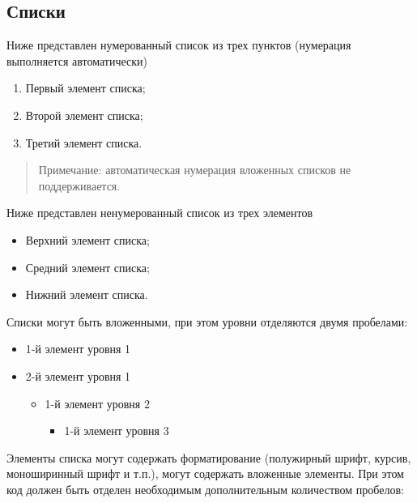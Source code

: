 \documentclass[
  a4paper,
]{book}
\providecommand{\tightlist}{%
  \setlength{\itemsep}{0pt}\setlength{\parskip}{0pt}}
\theoremstyle{definition}
\theoremstyle{definition}
\theoremstyle{definition}
\theoremstyle{definition}
\theoremstyle{remark}
\begin{document}
\hypertarget{markdown-syntax-lists}{%
\subsection{Списки}\label{markdown-syntax-lists}}

Ниже представлен нумерованный список из трех пунктов (нумерация выполняется автоматически)

\begin{enumerate}
\def\labelenumi{\arabic{enumi}.}
\tightlist
\item
  Первый элемент списка;
\item
  Второй элемент списка;
\item
  Третий элемент списка.
\end{enumerate}

\begin{quote}
Примечание: автоматическая нумерация вложенных списков не поддерживается.
\end{quote}

Ниже представлен ненумерованный список из трех элементов

\begin{itemize}
\tightlist
\item
  Верхний элемент списка;
\item
  Средний элемент списка;
\item
  Нижний элемент списка.
\end{itemize}

Списки могут быть вложенными, при этом уровни отделяются двумя пробелами:

\begin{itemize}
\tightlist
\item
  1-й элемент уровня 1
\item
  2-й элемент уровня 1

  \begin{itemize}
  \tightlist
  \item
    1-й элемент уровня 2

    \begin{itemize}
    \tightlist
    \item
      1-й элемент уровня 3
    \end{itemize}
  \end{itemize}
\end{itemize}

Элементы списка могут содержать форматирование (полужирный шрифт, курсив, моноширинный шрифт и т.п.), могут содержать вложенные элементы. При этом код должен быть отделен необходимым дополнительным количеством пробелов:
\end{document}
